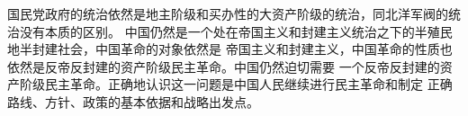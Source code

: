 \documentclass[10pt, UTF8]{book} %
\begin{document}

国民党政府的统治依然是地主阶级和买办性的大资产阶级的统治，同北洋军阀的统治没有本质的区别。
中国仍然是一个处在帝国主义和封建主义统治之下的半殖民地半封建社会，中国革命的对象依然是
帝国主义和封建主义，中国革命的性质也依然是反帝反封建的资产阶级民主革命。中国仍然迫切需要
一个反帝反封建的资产阶级民主革命。正确地认识这一问题是中国人民继续进行民主革命和制定
正确路线、方针、政策的基本依据和战略出发点。





\end{document}
